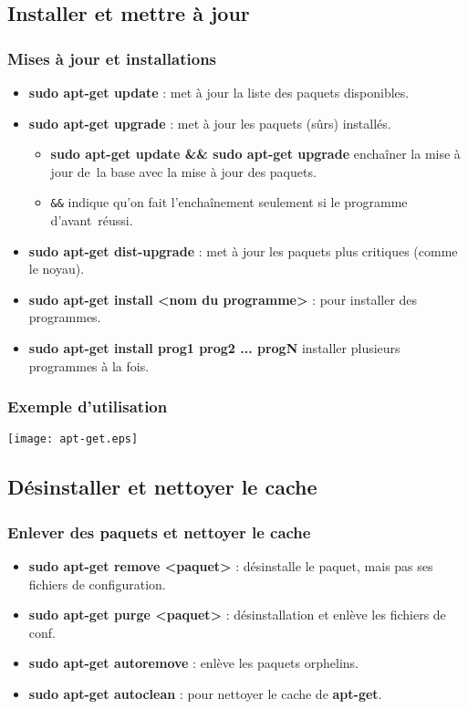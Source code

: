 \documentclass{beamer}
\begin{document}
    \subsection{Installer et mettre à jour}
    \begin{frame}
        \frametitle{Mises à jour et installations}
        \begin{itemize}
            \item {\bf sudo apt-get update} : met à jour la liste des paquets disponibles.
            \item {\bf sudo apt-get upgrade} : met à jour les paquets (sûrs) installés.
                \begin{itemize}
                    \item {\bf sudo apt-get update \&\& sudo apt-get upgrade} enchaîner la mise à jour de\
                        la base avec la mise à jour des paquets.
                    \item \texttt{\&\&} indique qu'on fait l'enchaînement seulement si le programme d'avant\
                        réussi.
                \end{itemize}
            \item {\bf sudo apt-get dist-upgrade} : met à jour les paquets plus critiques (comme le noyau).
            \item {\bf sudo apt-get install <nom du programme>} : pour installer des programmes.
            \item {\bf sudo apt-get install prog1 prog2 ... progN} installer plusieurs programmes à la fois.
        \end{itemize}
    \end{frame}

    \begin{frame}
        \frametitle{Exemple d'utilisation}
        \center \texttt{[image: apt-get.eps]}
    \end{frame}

    \subsection{Désinstaller et nettoyer le cache}
    \begin{frame}
        \frametitle{Enlever des paquets et nettoyer le cache}
        \begin{itemize}
            \item {\bf sudo apt-get remove <paquet>} : désinstalle le paquet, mais pas ses fichiers de configuration.
            \item {\bf sudo apt-get purge <paquet>} : désinstallation et enlève les fichiers de conf.
            \item {\bf sudo apt-get autoremove} : enlève les paquets orphelins.
            \item {\bf sudo apt-get autoclean} : pour nettoyer le cache de {\bf apt-get}.
        \end{itemize}
    \end{frame}
\end{document}
